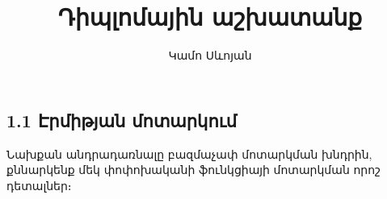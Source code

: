 \documentclass[fleqn, bachelor,subf,12pt,notitlepage]{article}
\title{Դիպլոմային աշխատանք}
\author{Կամո Սևոյան}
\begin{document}
\section*{}


\newpage
\sloppy


\section*{}
\subsection*{{1.1 Էրմիթյան մոտարկում}}
\hspace{\parindent}Նախքան անդրադառնալը բազմաչափ մոտարկման խնդրին, քննարկենք մեկ փոփոխականի ֆունկցիայի մոտարկման որոշ դետալներ։
\end{document}
